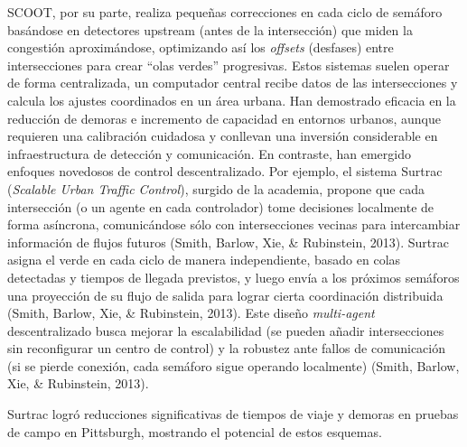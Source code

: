 \documentclass[12pt,a4paper,oneside]{report}
\begin{document}
SCOOT, por su parte, realiza pequeñas correcciones en cada ciclo de semáforo basándose en detectores upstream (antes de la intersección) que miden la congestión aproximándose, optimizando así los \emph{offsets} (desfases) entre intersecciones para crear ``olas verdes'' progresivas. Estos sistemas suelen operar de forma centralizada, un computador central recibe datos de las intersecciones y calcula los ajustes coordinados en un área urbana. Han demostrado eficacia en la reducción de demoras e incremento de capacidad en entornos urbanos, aunque requieren una calibración cuidadosa y conllevan una inversión considerable en infraestructura de detección y comunicación\hspace{0pt}. En contraste, han emergido enfoques novedosos de control descentralizado. Por ejemplo, el sistema Surtrac (\emph{Scalable Urban Traffic Control}), surgido de la academia, propone que cada intersección (o un agente en cada controlador) tome decisiones localmente de forma asíncrona, comunicándose sólo con intersecciones vecinas para intercambiar información de flujos futuros\hspace{0pt} (Smith, Barlow, Xie, \& Rubinstein, 2013). Surtrac asigna el verde en cada ciclo de manera independiente, basado en colas detectadas y tiempos de llegada previstos, y luego envía a los próximos semáforos una proyección de su flujo de salida para lograr cierta coordinación distribuida\hspace{0pt} (Smith, Barlow, Xie, \& Rubinstein, 2013). Este diseño \emph{multi-agent} descentralizado busca mejorar la escalabilidad (se pueden añadir intersecciones sin reconfigurar un centro de control) y la robustez ante fallos de comunicación (si se pierde conexión, cada semáforo sigue operando localmente) (Smith, Barlow, Xie, \& Rubinstein, 2013).

Surtrac logró reducciones significativas de tiempos de viaje y demoras en pruebas de campo en Pittsburgh\hspace{0pt}, mostrando el potencial de estos esquemas.
\end{document}
